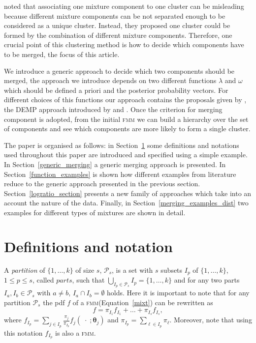 \documentclass[10pt, a4paper]{article}
\newcommand{\m}[1]{\boldsymbol{#1}}
\newcommand{\fmm}{\textsc{fmm}\xspace}
\begin{document}
\begin{spacing}{1.9}
\cite{lee2004combining,hennig2010methods,baudry2010combining,melnykov2013distribution,pastore2013merging} noted that associating one mixture component to one cluster can be misleading because different mixture components can be not separated enough to be considered as a unique cluster. Instead, they proposed one cluster could be formed by the combination of different mixture components. Therefore, one crucial point of this clustering method is how to decide which components have to be merged, the focus of this article.


We introduce a generic approach to decide which two components should be merged, the approach we introduce depends on two different functions $\lambda$ and $\omega$ which should be defined a priori and the posterior probability vectors. For different choices of this functions our approach contains the proposals given by \cite{baudry2010combining}, the DEMP approach introduced by \cite{hennig2010methods} and \cite{longford2014}. Once the criterion for merging component is adopted, from the initial \fmm we can build a hierarchy over the set of components and see which components are more likely to form a single cluster.

The paper is organised as follows: in Section~\ref{definitions} some definitions and notations used throughout this paper are introduced and specified using a simple example. In Section~\ref{generic_merging} a generic merging approach is presented. In Section~\ref{function_examples} is shown how different examples from literature reduce to the generic approach presented in the previous section. Section~\ref{logratio_section} presents a new family of approaches which take into an account the nature of the data. Finally, in Section~\ref{merging_examples_dist} two examples for different types of mixtures are shown in detail.


\section{Definitions and notation}\label{definitions}

%
A \emph{partition} of $\{1, \dots, k\}$ of size $s$, $\mathcal{P}_s$,  is a set with $s$ subsets $I_p$ of $\{1, \dots, k\}$, $1\leq p \leq s$, called $parts$, such that $\bigcup_{I_p \in \mathcal{P}_s} I_p = \{1, \dots, k\}$ and for any two parts $I_a, I_b \in \mathcal{P}_s$ with $a \neq b$, $I_a \cap I_b = \emptyset$ holds. Here it is important to note that for any partition  $\mathcal{P}_s$ the pdf $f$ of a \fmm (Equation~\ref{mixt}) can be rewritten as
\begin{equation}
f = \pi_{I_1} f_{I_1} + \dots + \pi_{I_s} f_{I_s},
\label{mixt_part}
\end{equation}
where $f_{I_p} = \sum_{j \in I_p} \frac{\pi_j}{\pi_{I_p}} f_j(\;\cdot\; ; \m\theta_j)$ and $\pi_{I_p} = \sum_{\ell \in I_p} \pi_\ell$. Moreover, note that using this notation $f_{I_p}$ is also a \fmm.




\end{spacing}
\end{document}
